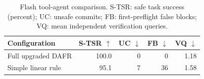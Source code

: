 \begin{table}[t]
\centering
\small
\setlength{\tabcolsep}{3pt}
\begin{tabular}{lrrrr}
\toprule
Configuration & S-TSR $\uparrow$ & UC $\downarrow$ & FB $\downarrow$ & VQ $\downarrow$ \\
\midrule
Full upgraded DAFR & 100.0 & 0 & 0 & 1.18 \\
Simple linear rule & 95.1 & 7 & 36 & 1.58 \\
\bottomrule
\end{tabular}
\caption{Flash tool-agent comparison. S-TSR: safe task success (percent); UC: unsafe commits; FB: first-preflight false blocks; VQ: mean independent verification queries.}
\label{tab:flash-geometry-comparison}
\end{table}
